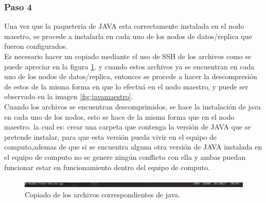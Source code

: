 \subsubsection{Paso 4}
Una vez que la paquetería de JAVA esta correctamente instalada en el nodo maestro, se procede a instalarla en cada uno de los nodos de datos/replica que fueron configurados.\\
Es necesario hacer un copiado mediante el uso de SSH de los archivos como se puede apreciar en la figura \ref{fig:copiajava}. y cuando estos archivos ya se encuentran en cada uno de los nodos de datos/replica, entonces se procede a hacer la descompresión de estos de la misma forma en que lo efectuá en el nodo maestro, y puede ser observado en la imagen \ref{fig:javamaestro}.
\\
Cuando los archivos se encuentran descomprimidos, se hace la instalación de java en cada uno de los nodos, esto se hace de la misma forma que en el nodo maestro. la cual es: crear una carpeta que contenga la versión de JAVA que se pretende instalar, para que esta versión pueda vivir en el equipo de computo,ademas de que si se encuentra alguna otra versión de JAVA instalada en el equipo de computo no se genere ningún conflicto con ella y ambas puedan funcionar estar en funcionamiento dentro del equipo de computo.
\begin{figure}[H]
	\hypertarget{fig:copiajava}{\hspace{1pt}}
	\begin{center}	
		\includegraphics[width=1\textwidth]{capitulo5/images/copiaeinstalacionjava.png}
		\caption{Copiado de los archivos correspondientes de java.}
		\label{fig:copiajava}
	\end{center}
\end{figure}
